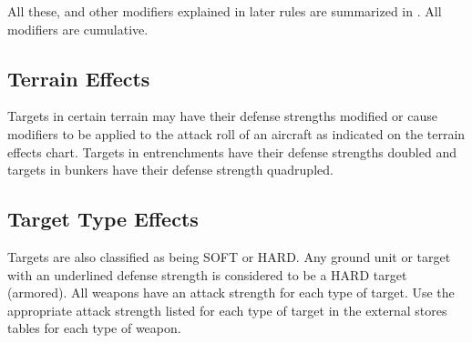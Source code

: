 All these, and other modifiers explained in later rules are summarized in . All modifiers are cumulative.

\subsection{Terrain Effects} Targets in certain terrain may have their defense strengths modified or cause modifiers to be applied to the attack roll of an aircraft as indicated on the terrain effects chart. Targets in entrenchments have their defense strengths doubled and targets in bunkers have their defense strength quadrupled.

\subsection{Target Type Effects} Targets are also classified as being SOFT or HARD. Any ground unit or target with an underlined defense strength is considered to be a HARD target (armored). All weapons have an attack strength for each type of target. Use the appropriate attack strength listed for each type of target in the external stores tables for each type of weapon.


